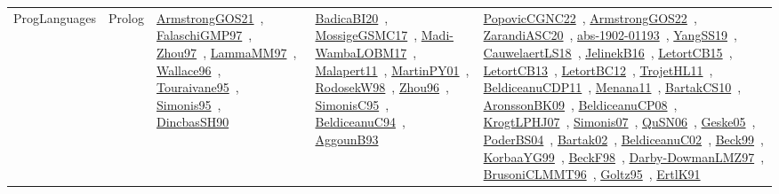{\begin{longtable}{lp{3cm}>{\raggedright\arraybackslash}p{6cm}>{\raggedright\arraybackslash}p{6cm}>{\raggedright\arraybackslash}p{8cm}}
ProgLanguages & Prolog & \href{works/ArmstrongGOS21.pdf}{ArmstrongGOS21}~\cite{ArmstrongGOS21}, \href{works/FalaschiGMP97.pdf}{FalaschiGMP97}~\cite{FalaschiGMP97}, \href{works/Zhou97.pdf}{Zhou97}~\cite{Zhou97}, \href{works/LammaMM97.pdf}{LammaMM97}~\cite{LammaMM97}, \href{works/Wallace96.pdf}{Wallace96}~\cite{Wallace96}, \href{works/Touraivane95.pdf}{Touraivane95}~\cite{Touraivane95}, \href{works/Simonis95.pdf}{Simonis95}~\cite{Simonis95}, \href{works/DincbasSH90.pdf}{DincbasSH90}~\cite{DincbasSH90} & \href{works/BadicaBI20.pdf}{BadicaBI20}~\cite{BadicaBI20}, \href{works/MossigeGSMC17.pdf}{MossigeGSMC17}~\cite{MossigeGSMC17}, \href{works/Madi-WambaLOBM17.pdf}{Madi-WambaLOBM17}~\cite{Madi-WambaLOBM17}, \href{works/Malapert11.pdf}{Malapert11}~\cite{Malapert11}, \href{works/MartinPY01.pdf}{MartinPY01}~\cite{MartinPY01}, \href{works/RodosekW98.pdf}{RodosekW98}~\cite{RodosekW98}, \href{works/Zhou96.pdf}{Zhou96}~\cite{Zhou96}, \href{works/SimonisC95.pdf}{SimonisC95}~\cite{SimonisC95}, \href{works/BeldiceanuC94.pdf}{BeldiceanuC94}~\cite{BeldiceanuC94}, \href{works/AggounB93.pdf}{AggounB93}~\cite{AggounB93} & \href{works/PopovicCGNC22.pdf}{PopovicCGNC22}~\cite{PopovicCGNC22}, \href{works/ArmstrongGOS22.pdf}{ArmstrongGOS22}~\cite{ArmstrongGOS22}, \href{works/ZarandiASC20.pdf}{ZarandiASC20}~\cite{ZarandiASC20}, \href{works/abs-1902-01193.pdf}{abs-1902-01193}~\cite{abs-1902-01193}, \href{works/YangSS19.pdf}{YangSS19}~\cite{YangSS19}, \href{works/CauwelaertLS18.pdf}{CauwelaertLS18}~\cite{CauwelaertLS18}, \href{works/JelinekB16.pdf}{JelinekB16}~\cite{JelinekB16}, \href{works/LetortCB15.pdf}{LetortCB15}~\cite{LetortCB15}, \href{works/LetortCB13.pdf}{LetortCB13}~\cite{LetortCB13}, \href{works/LetortBC12.pdf}{LetortBC12}~\cite{LetortBC12}, \href{works/TrojetHL11.pdf}{TrojetHL11}~\cite{TrojetHL11}, \href{works/BeldiceanuCDP11.pdf}{BeldiceanuCDP11}~\cite{BeldiceanuCDP11}, \href{works/Menana11.pdf}{Menana11}~\cite{Menana11}, \href{works/BartakCS10.pdf}{BartakCS10}~\cite{BartakCS10}, \href{works/AronssonBK09.pdf}{AronssonBK09}~\cite{AronssonBK09}, \href{works/BeldiceanuCP08.pdf}{BeldiceanuCP08}~\cite{BeldiceanuCP08}, \href{works/KrogtLPHJ07.pdf}{KrogtLPHJ07}~\cite{KrogtLPHJ07}, \href{works/Simonis07.pdf}{Simonis07}~\cite{Simonis07}, \href{works/QuSN06.pdf}{QuSN06}~\cite{QuSN06}, \href{works/Geske05.pdf}{Geske05}~\cite{Geske05}, \href{works/PoderBS04.pdf}{PoderBS04}~\cite{PoderBS04}, \href{works/Bartak02.pdf}{Bartak02}~\cite{Bartak02}, \href{works/BeldiceanuC02.pdf}{BeldiceanuC02}~\cite{BeldiceanuC02}, \href{works/Beck99.pdf}{Beck99}~\cite{Beck99}, \href{works/KorbaaYG99.pdf}{KorbaaYG99}~\cite{KorbaaYG99}, \href{works/BeckF98.pdf}{BeckF98}~\cite{BeckF98}, \href{works/Darby-DowmanLMZ97.pdf}{Darby-DowmanLMZ97}~\cite{Darby-DowmanLMZ97}, \href{works/BrusoniCLMMT96.pdf}{BrusoniCLMMT96}~\cite{BrusoniCLMMT96}, \href{works/Goltz95.pdf}{Goltz95}~\cite{Goltz95}, \href{works/ErtlK91.pdf}{ErtlK91}~\cite{ErtlK91}\\

\end{longtable}}
